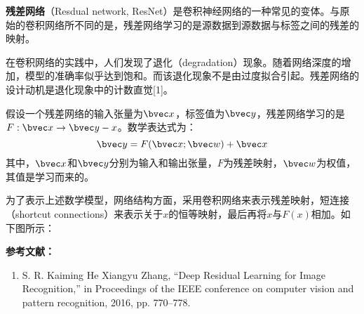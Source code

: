 
\textbf{残差网络}（Resdual network, ResNet）是卷积神经网络的一种常见的变体。与原始的卷积网络所不同的是，残差网络学习的是源数据到源数据与标签之间的残差的映射。

在卷积网络的实践中，人们发现了退化（degradation）现象。随着网络深度的增加，模型的准确率似乎达到饱和。而该退化现象不是由过度拟合引起。残差网络的设计动机是退化现象中的计数直觉[1]。

假设一个残差网络的输入张量为$\bvec x$，标签值为$\bvec y$，残差网络学习的是$F: \bvec x \rightarrow \bvec y-x$。数学表达式为：
\begin{equation}
\bvec y=F(\bvec  x;\bvec  w)+\bvec x
\end{equation}
其中，$\bvec x$和$\bvec y$分别为输入和输出张量，$F$为残差映射，$\bvec w$为权值，其值是学习而来的。

为了表示上述数学模型，网络结构方面，采用卷积网络来表示残差映射，短连接（shortcut connections）来表示关于$x$的恒等映射，最后再将$x$与$F(x)$相加。如下图所示：


\textbf{参考文献：}
\begin{enumerate}
\item S. R. Kaiming He Xiangyu Zhang, “Deep Residual Learning for Image Recognition,” in Proceedings of the IEEE conference on computer vision and pattern recognition, 2016, pp. 770–778.
\end{enumerate}